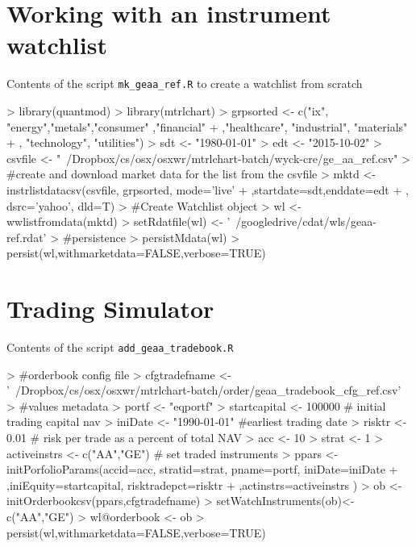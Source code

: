 \documentclass{article}
\begin{document}
\begin{appendices}

\section{Working with an instrument watchlist}
Contents of the script \texttt{mk\_geaa\_ref.R} to create a watchlist from scratch
\begin{Schunk}
\begin{Sinput}
> library(quantmod)
> library(mtrlchart)
> grpsorted <- c("ix", "energy","metals","consumer" ,"financial"
+                       ,"healthcare", "industrial", "materials"
+                       , "technology", "utilities")
> sdt <- "1980-01-01"
> edt <- "2015-10-02"
> csvfile <- "~/Dropbox/cs/osx/osxwr/mtrlchart-batch/wyck-cre/ge_aa_ref.csv"
> #create and download market data for the list from the csvfile
> mktd <- instrlistdatacsv(csvfile, grpsorted,  mode='live'
+                         ,startdate=sdt,enddate=edt
+                         , dsrc='yahoo', dld=T)
> #Create Watchlist object
> wl <- wwlistfromdata(mktd)
> setRdatfile(wl) <- '~/googledrive/cdat/wls/geaa-ref.rdat'
> #persistence
> persistMdata(wl)
> persist(wl,withmarketdata=FALSE,verbose=TRUE)
\end{Sinput}
\end{Schunk}

\section{Trading Simulator}
\label{trap}
Contents of the script \texttt{add\_geaa\_tradebook.R}

\begin{Schunk}
\begin{Sinput}
> #orderbook config file
> cfgtradefname <- '~/Dropbox/cs/osx/osxwr/mtrlchart-batch/order/geaa_tradebook_cfg_ref.csv'
> #values metadata
> portf <- "eqportf"
> startcapital <- 100000  # initial trading capital nav
> iniDate <- "1990-01-01"  #earliest trading date
> risktr <- 0.01  # risk per trade as a percent of total NAV
> acc <- 10
> strat <- 1    
> activeinstrs <- c("AA","GE") # set traded  instruments
> ppars <- initPorfolioParams(accid=acc, stratid=strat, pname=portf, iniDate=iniDate
+                                 ,iniEquity=startcapital, risktradepct=risktr
+                                 ,actinstrs=activeinstrs )
> ob <- initOrderbookcsv(ppars,cfgtradefname)
> setWatchInstruments(ob)<-c("AA","GE")
> wl@orderbook <- ob
> persist(wl,withmarketdata=FALSE,verbose=TRUE)
\end{Sinput}
\end{Schunk}


\end{appendices}
\end{document}
